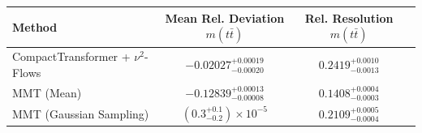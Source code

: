     \begin{tabular}{lccc}
        \toprule
        Method & Mean Rel. Deviation $m(t\bar{t})$ & Rel. Resolution $m(t\bar{t})$ \\
        \midrule
        CompactTransformer + $\nu^2$-Flows & $-0.02027^{+0.00019}_{-0.00020}$ & $0.2419^{+0.0010}_{-0.0013}$ \\
        MMT (Mean) & $-0.12839^{+0.00013}_{-0.00008}$ & $0.1408^{+0.0004}_{-0.0003}$ \\
        MMT (Gaussian Sampling) & $(0.3^{+0.1}_{-0.2})\times 10^{-5}$ & $0.2109^{+0.0005}_{-0.0004}$ \\
        \bottomrule
    \end{tabular}